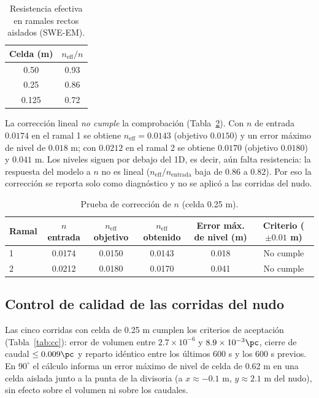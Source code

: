 \begin{table}[H]
\centering\small
\caption{Resistencia efectiva en ramales rectos aislados (SWE-EM).}\label{tab:neff}
\begin{tabular}{cc}
\toprule
Celda (m) & $n_\mathrm{eff}/n$\\\midrule
0.50 & 0.93\\
0.25 & 0.86\\
0.125 & 0.72\\\bottomrule
\end{tabular}
\end{table}

La corrección lineal \emph{no cumple} la comprobación (Tabla~\ref{tab:correccion}). Con $n$ de entrada $0.0174$ en el ramal 1 se obtiene $n_\mathrm{eff}=0.0143$ (objetivo $0.0150$) y un error máximo de nivel de $0.018$ m; con $0.0212$ en el ramal 2 se obtiene $0.0170$ (objetivo $0.0180$) y $0.041$ m. Los niveles siguen por debajo del 1D, es decir, aún falta resistencia: la respuesta del modelo a $n$ no es lineal ($n_\mathrm{eff}/n_\mathrm{entrada}$ baja de $0.86$ a $0.82$). Por eso la corrección se reporta solo como diagnóstico y no se aplicó a las corridas del nudo.

\begin{table}[H]
\centering\small
\caption{Prueba de corrección de $n$ (celda 0.25 m).}\label{tab:correccion}
\begin{tabular}{lccccc}
\toprule
Ramal & $n$ entrada & $n_\mathrm{eff}$ objetivo & $n_\mathrm{eff}$ obtenido & Error máx. de nivel (m) & Criterio ($\pm0.01$ m)\\\midrule
1 & 0.0174 & 0.0150 & 0.0143 & 0.018 & No cumple\\
2 & 0.0212 & 0.0180 & 0.0170 & 0.041 & No cumple\\\bottomrule
\end{tabular}
\end{table}

\subsection{Control de calidad de las corridas del nudo}
Las cinco corridas con celda de 0.25 m cumplen los criterios de aceptación (Tabla~\ref{tab:cc}): error de volumen entre $2.7\times10^{-6}$ y $8.9\times10^{-3}\pc$, cierre de caudal $\leq0.009\pc$ y reparto idéntico entre los últimos 600 s y los 600 s previos. En $90^\circ$ el cálculo informa un error máximo de nivel de celda de 0.62 m en una celda aislada junto a la punta de la divisoria (a $x\approx-0.1$ m, $y\approx2.1$ m del nudo), sin efecto sobre el volumen ni sobre los caudales.


